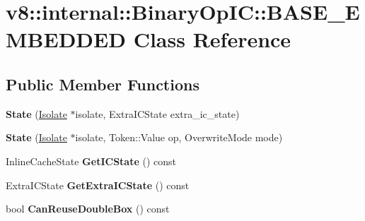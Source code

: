 \hypertarget{classv8_1_1internal_1_1_binary_op_i_c_1_1_b_a_s_e___e_m_b_e_d_d_e_d}{}\section{v8\+:\+:internal\+:\+:Binary\+Op\+I\+C\+:\+:B\+A\+S\+E\+\_\+\+E\+M\+B\+E\+D\+D\+E\+D Class Reference}
\label{classv8_1_1internal_1_1_binary_op_i_c_1_1_b_a_s_e___e_m_b_e_d_d_e_d}
\subsection*{Public Member Functions}
\begin{DoxyCompactItemize}
\item 
\hypertarget{classv8_1_1internal_1_1_binary_op_i_c_1_1_b_a_s_e___e_m_b_e_d_d_e_d_a4e3067f4cfab344404553404f9500a9a}{}{\bfseries State} (\hyperlink{classv8_1_1internal_1_1_isolate}{Isolate} $\ast$isolate, Extra\+I\+C\+State extra\+\_\+ic\+\_\+state)\label{classv8_1_1internal_1_1_binary_op_i_c_1_1_b_a_s_e___e_m_b_e_d_d_e_d_a4e3067f4cfab344404553404f9500a9a}

\item 
\hypertarget{classv8_1_1internal_1_1_binary_op_i_c_1_1_b_a_s_e___e_m_b_e_d_d_e_d_a0c7decf7f6cfe35986a55600c3b40f9e}{}{\bfseries State} (\hyperlink{classv8_1_1internal_1_1_isolate}{Isolate} $\ast$isolate, Token\+::\+Value op, Overwrite\+Mode mode)\label{classv8_1_1internal_1_1_binary_op_i_c_1_1_b_a_s_e___e_m_b_e_d_d_e_d_a0c7decf7f6cfe35986a55600c3b40f9e}

\item 
\hypertarget{classv8_1_1internal_1_1_binary_op_i_c_1_1_b_a_s_e___e_m_b_e_d_d_e_d_a03a4dbe316fbc415337703f78e8c656f}{}Inline\+Cache\+State {\bfseries Get\+I\+C\+State} () const \label{classv8_1_1internal_1_1_binary_op_i_c_1_1_b_a_s_e___e_m_b_e_d_d_e_d_a03a4dbe316fbc415337703f78e8c656f}

\item 
\hypertarget{classv8_1_1internal_1_1_binary_op_i_c_1_1_b_a_s_e___e_m_b_e_d_d_e_d_aacdd06b36bf1ef3898b856888dc3aaee}{}Extra\+I\+C\+State {\bfseries Get\+Extra\+I\+C\+State} () const \label{classv8_1_1internal_1_1_binary_op_i_c_1_1_b_a_s_e___e_m_b_e_d_d_e_d_aacdd06b36bf1ef3898b856888dc3aaee}

\item 
\hypertarget{classv8_1_1internal_1_1_binary_op_i_c_1_1_b_a_s_e___e_m_b_e_d_d_e_d_a2f409cc2e2aa7ccc660cf88b049fd8c2}{}bool {\bfseries Can\+Reuse\+Double\+Box} () const \label{classv8_1_1internal_1_1_binary_op_i_c_1_1_b_a_s_e___e_m_b_e_d_d_e_d_a2f409cc2e2aa7ccc660cf88b049fd8c2}


\end{DoxyCompactItemize}
